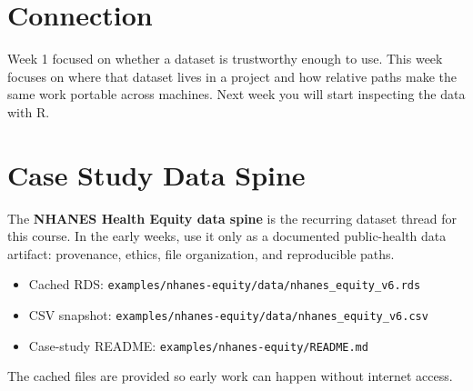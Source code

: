 \documentclass[
  letterpaper,
  DIV=11,
  numbers=noendperiod,
  oneside]{scrreprt}
\providecommand{\tightlist}{%
  \setlength{\itemsep}{0pt}\setlength{\parskip}{0pt}}
\begin{document}
\section*{Connection}\label{connection-1}


Week 1 focused on whether a dataset is trustworthy enough to use. This
week focuses on where that dataset lives in a project and how relative
paths make the same work portable across machines. Next week you will
start inspecting the data with R.

\section*{Case Study Data Spine}\label{case-study-data-spine-1}


The \textbf{NHANES Health Equity data spine} is the recurring dataset
thread for this course. In the early weeks, use it only as a documented
public-health data artifact: provenance, ethics, file organization, and
reproducible paths.

\begin{itemize}
\tightlist
\item
  Cached RDS:
  \texttt{examples/nhanes-equity/data/nhanes\_equity\_v6.rds}
\item
  CSV snapshot:
  \texttt{examples/nhanes-equity/data/nhanes\_equity\_v6.csv}
\item
  Case-study README: \texttt{examples/nhanes-equity/README.md}
\end{itemize}

The cached files are provided so early work can happen without internet
access.
\end{document}
